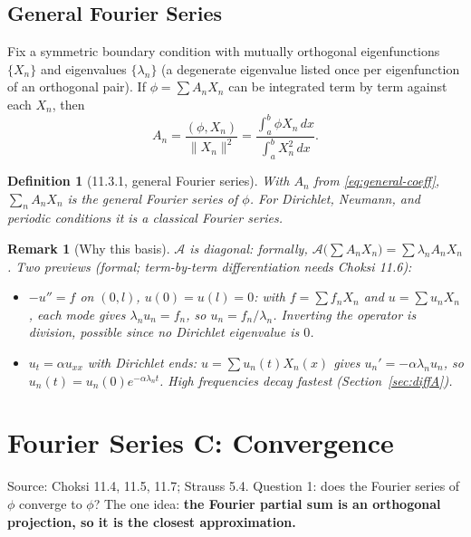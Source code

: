 \documentclass{article}
\newtheorem{definition}{Definition}
\newtheorem{remark}{Remark}
\begin{document}
\subsection{General Fourier Series}
Fix a symmetric boundary condition with mutually orthogonal eigenfunctions $\{X_n\}$ and eigenvalues $\{\lambda_n\}$ (a degenerate eigenvalue listed once per eigenfunction of an orthogonal pair). If $\phi = \sum A_nX_n$ can be integrated term by term against each $X_n$, then
\begin{equation}\label{eq:general-coeff}
    A_n = \frac{(\phi, X_n)}{\|X_n\|^2} = \frac{\int_a^b\phi X_n\,dx}{\int_a^b X_n^2\,dx}.
\end{equation}
\begin{definition}[11.3.1, general Fourier series]
    With $A_n$ from \eqref{eq:general-coeff}, $\sum_n A_nX_n$ is the general Fourier series of $\phi$. For Dirichlet, Neumann, and periodic conditions it is a \emph{classical} Fourier series.
\end{definition}
\begin{remark}[Why this basis]
    $\mathcal{A}$ is diagonal: formally, $\mathcal{A}\big(\sum A_nX_n\big) = \sum\lambda_nA_nX_n$. Two previews (formal; term-by-term differentiation needs Choksi 11.6):
    \begin{itemize}
        \item $-u'' = f$ on $(0,l)$, $u(0) = u(l) = 0$: with $f = \sum f_nX_n$ and $u = \sum u_nX_n$, each mode gives $\lambda_nu_n = f_n$, so $u_n = f_n/\lambda_n$. Inverting the operator is division, possible since no Dirichlet eigenvalue is $0$.
        \item $u_t = \alpha u_{xx}$ with Dirichlet ends: $u = \sum u_n(t)X_n(x)$ gives $u_n' = -\alpha\lambda_nu_n$, so $u_n(t) = u_n(0)e^{-\alpha\lambda_nt}$. High frequencies decay fastest (Section~\ref{sec:diffA}).
    \end{itemize}
\end{remark}


\section{Fourier Series C: Convergence}\label{sec:fourierC}
Source: Choksi 11.4, 11.5, 11.7; Strauss 5.4. Question 1: does the Fourier series of $\phi$ converge to $\phi$? The one idea: \textbf{the Fourier partial sum is an orthogonal projection, so it is the closest approximation.}
\end{document}
